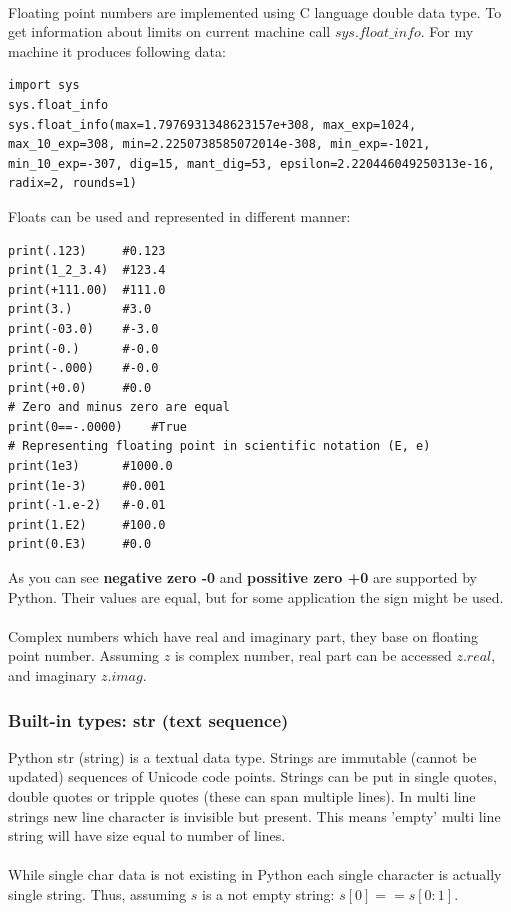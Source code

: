 \documentclass{article}
\begin{document}
	\paragraph{}
	Floating point numbers are implemented using C language double data type. To get information about limits on current machine call $sys.float\_info$. For my machine it produces following data:
	\begin{lstlisting}[style=pystyle]
import sys
sys.float_info
sys.float_info(max=1.7976931348623157e+308, max_exp=1024, max_10_exp=308, min=2.2250738585072014e-308, min_exp=-1021, min_10_exp=-307, dig=15, mant_dig=53, epsilon=2.220446049250313e-16, radix=2, rounds=1)
	\end{lstlisting}
	Floats can be used and represented in different manner:
	\begin{lstlisting}[style=pystyle]
print(.123)		#0.123
print(1_2_3.4)	#123.4
print(+111.00)	#111.0
print(3.)		#3.0
print(-03.0)	#-3.0
print(-0.)		#-0.0
print(-.000)	#-0.0 
print(+0.0)		#0.0
# Zero and minus zero are equal
print(0==-.0000)	#True
# Representing floating point in scientific notation (E, e)
print(1e3)		#1000.0
print(1e-3)		#0.001
print(-1.e-2)	#-0.01
print(1.E2)		#100.0
print(0.E3)		#0.0
	\end{lstlisting}
	As you can see \textbf{negative zero -0} and \textbf{possitive zero +0} are supported by Python. Their values are equal, but for some application the sign might be used.
	\paragraph{}
	Complex numbers which have real and imaginary part, they base on floating point number. Assuming $z$ is complex number, real part can be accessed $z.real$, and imaginary $z.imag$.
	

	\subsubsection{Built-in types: str (text sequence)} 
	Python str (string) is a textual data type. Strings are immutable (cannot be updated) sequences of Unicode code points. Strings can be put in single quotes, double quotes or tripple quotes (these can span multiple lines). In multi line strings new line character is invisible but present. This means 'empty' multi line string will have size equal to number of lines.
	\paragraph{}
	While single char data is not existing in Python each single character is actually single string. Thus, assuming $s$ is a not empty string: $s[0] == s[0:1]$.
\end{document}
